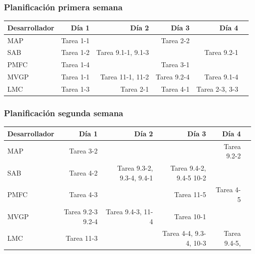 \documentclass[spanish]{beamer}
\begin{document}
\begin{frame}
	\frametitle{Planificación primera semana}
	\begin{table}[H]
	\begin{adjustbox}{width=\textwidth}
	\begin{tabular}{lrrrrr}
	  \toprule
	  \textbf{Desarrollador} & \textbf{Día 1} & \textbf{Día 2} & \textbf{Día 3} & \textbf{Día 4} \\
	  \midrule
	  MAP  &Tarea 1-1 & & Tarea 2-2 &  \\
	  SAB &   Tarea 1-2  & Tarea 9.1-1, 9.1-3 &  & Tarea 9.2-1\\
	  PMFC &Tarea 1-4 & &Tarea 3-1 \\
	  MVGP & Tarea 1-1 &Tarea 11-1, 11-2 &Tarea 9.2-4 & Tarea 9.1-4 \\
	  LMC & Tarea 1-3 & Tarea 2-1 & Tarea 4-1& Tarea 2-3, 3-3 \\
	  \bottomrule
	\end{tabular}
	\end{adjustbox}
	\end{table}
\end{frame}

\begin{frame}
	\frametitle{Planificación segunda semana}
	\begin{table}[H]
	\begin{adjustbox}{width=\textwidth}
	\begin{tabular}{lrrrrr}
	  \toprule
	  \textbf{Desarrollador} & \textbf{Día 1} & \textbf{Día 2} & \textbf{Día 3} & \textbf{Día 4} \\
	  \midrule
	  MAP &Tarea 3-2  && & Tarea 9.2-2 \\
	  SAB & Tarea 4-2  & Tarea 9.3-2, 9.3-4, 9.4-1 & Tarea 9.4-2, 9.4-5 10-2 \\
	  PMFC & Tarea 4-3 &  &Tarea 11-5 & Tarea 4-5 \\
	  MVGP &Tarea 9.2-3 9.2-4& Tarea 9.4-3, 11-4&Tarea 10-1 & \\
	  LMC  &Tarea 11-3&& Tarea 4-4, 9.3-4, 10-3& Tarea 9.4-5, \\
	  \bottomrule
	\end{tabular}
	\end{adjustbox}
	\end{table}
\end{frame}
\end{document}
